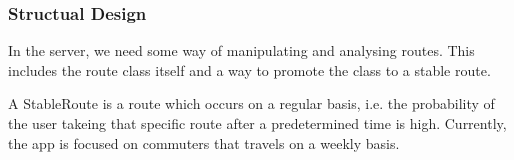 \subsubsection{Structual Design}
In the server, we need some way of manipulating and analysing routes.
This includes the route class itself and a way to promote the class to a stable route.

A StableRoute is a route which occurs on a regular basis, i.e. the probability of the user takeing that specific route after a predetermined time is high.
Currently, the app is focused on commuters that travels on a weekly basis.

\begin{tikzpicture}[
	class/.style = {draw, rectangle split, rectangle split parts=3, drop shadow}
]
\end{tikzpicture}